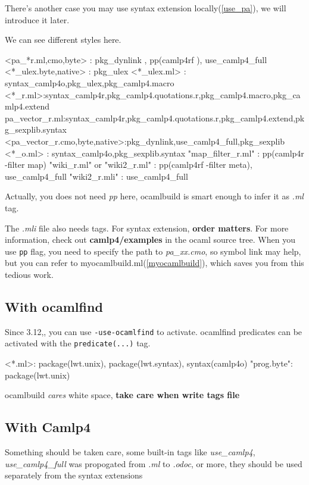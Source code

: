 There's another case you may use syntax extension
locally(\ref{use_pa}), we will introduce it later.

We can see different styles here.

\begin{bashcode}
<pa_*r.{ml,cmo,byte}> : pkg_dynlink , pp(camlp4rf ), use_camlp4_full
<*_ulex.{byte,native}> : pkg_ulex 
<*_ulex.ml> : syntax_camlp4o,pkg_ulex,pkg_camlp4.macro  
<*_r.ml>:syntax_camlp4r,pkg_camlp4.quotations.r,pkg_camlp4.macro,pkg_camlp4.extend 
pa_vector_r.ml:syntax_camlp4r,pkg_camlp4.quotations.r,pkg_camlp4.extend,pkg_sexplib.syntax
<pa_vector_r.{cmo,byte,native}>:pkg_dynlink,use_camlp4_full,pkg_sexplib 
<*_o.ml> : syntax_camlp4o,pkg_sexplib.syntax 
"map_filter_r.ml" : pp(camlp4r -filter map)
"wiki_r.ml" or "wiki2_r.ml"  : pp(camlp4rf -filter meta), use_camlp4_full
"wiki2_r.mli" : use_camlp4_full 
\end{bashcode}

Actually, you does not need \textit{pp} here, ocamlbuild is smart
enough to infer it as \textit{.ml} tag.


The \textit{.mli} file also needs tags. For syntax extension,
\textbf{order matters}. For more information, check out \textbf{
  camlp4/examples} in the ocaml source tree. When you use \verb|pp|
flag, you need to specify the path to \textit{pa\_xx.cmo}, so symbol
link may help, but you can refer to
myocamlbuild.ml(\ref{myocamlbuild}), which saves you from this tedious
work.

\subsection{With ocamlfind}
Since 3.12,, you can use \verb|-use-ocamlfind| to activate. ocamlfind
predicates can be activated with the \verb|predicate(...)| tag.


\begin{bashcode}
<*.ml>: package(lwt.unix), package(lwt.syntax), syntax(camlp4o)
"prog.byte": package(lwt.unix)
\end{bashcode}

ocamlbuild \textit{cares} white space, \textbf{ take care when write
  tags file}

\subsection{With Camlp4}

Something should be taken care, some built-in tags like
\textit{use\_camlp4}, \textit{use\_camlp4\_full} was propogated
from \textit{.ml} to \textit{.odoc}, or more, they should be
used separately from the syntax extensions

